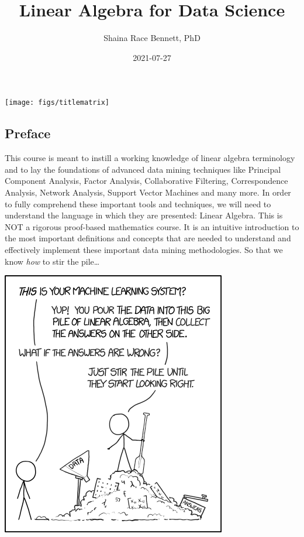 \documentclass[
]{article}
\title{Linear Algebra for Data Science}
\author{Shaina Race Bennett, PhD}
\date{2021-07-27}
\theoremstyle{definition}
\theoremstyle{definition}
\theoremstyle{definition}
\theoremstyle{definition}
\theoremstyle{remark}
\begin{document}
\maketitle

{
\setcounter{tocdepth}{2}
\tableofcontents
}
\hypertarget{section}{%
\section*{}\label{section}}

\begin{center}\texttt{[image: figs/titlematrix]} \end{center}

\hypertarget{preface}{%
\subsection*{Preface}\label{preface}}

This course is meant to instill a working knowledge of linear algebra terminology and to lay the foundations of advanced data mining techniques like Principal Component Analysis, Factor Analysis, Collaborative Filtering, Correspondence Analysis, Network Analysis, Support Vector Machines and many more. In order to fully comprehend these important tools and techniques, we will need to understand the language in which they are presented: Linear Algebra. This is NOT a rigorous proof-based mathematics course. It is an intuitive introduction to the most important definitions and concepts that are needed to understand and effectively implement these important data mining methodologies. So that we know \emph{how} to stir the pile\ldots{}

\begin{center}\includegraphics[width=0.4\linewidth]{figs/xkcd} \end{center}
\end{document}
